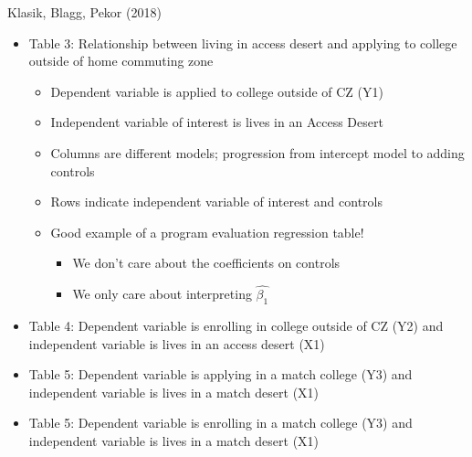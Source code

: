 \documentclass[8pt,ignorenonframetext,dvipsnames]{beamer}
\providecommand{\tightlist}{%
  \setlength{\itemsep}{0pt}\setlength{\parskip}{0pt}}
\let\olditem\item
\renewcommand{\item}{%
  \olditem\vspace{4pt}
}
\begin{document}
\begin{frame}{Klasik, Blagg, Pekor (2018)}
\protect\hypertarget{klasik-blagg-pekor-2018-2}{}

\begin{itemize}
\tightlist
\item
  Table 3: Relationship between living in access desert and applying to
  college outside of home commuting zone

  \begin{itemize}
  \tightlist
  \item
    Dependent variable is applied to college outside of CZ (Y1)
  \item
    Independent variable of interest is lives in an Access Desert
  \item
    Columns are different models; progression from intercept model to
    adding controls
  \item
    Rows indicate independent variable of interest and controls
  \item
    Good example of a program evaluation regression table!

    \begin{itemize}
    \tightlist
    \item
      We don't care about the coefficients on controls
    \item
      We only care about interpreting \(\hat{\beta_1}\)
    \end{itemize}
  \end{itemize}
\end{itemize}

\medskip

\begin{itemize}
\tightlist
\item
  Table 4: Dependent variable is enrolling in college outside of CZ (Y2)
  and independent variable is lives in an access desert (X1)
\item
  Table 5: Dependent variable is applying in a match college (Y3) and
  independent variable is lives in a match desert (X1)
\item
  Table 5: Dependent variable is enrolling in a match college (Y3) and
  independent variable is lives in a match desert (X1)
\end{itemize}

\end{frame}
\end{document}
